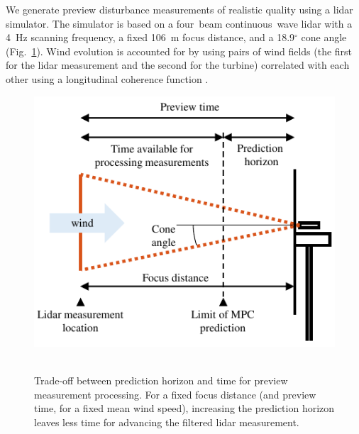 \documentclass[letterpaper, 10 pt, conference]{ieeeconf}  %
\begin{document}
We generate preview disturbance measurements of realistic quality using a lidar simulator. The simulator is based on a four~beam continuous~wave lidar with a 4~Hz scanning frequency,  a fixed 106~m focus distance, and a 18.9$^\circ$ cone angle (Fig.~\ref{fig:horizons}). Wind evolution is accounted for by using pairs of wind fields (the first for the lidar measurement and the second for the turbine) correlated with each other using a longitudinal coherence function \cite{SimleyPao2015}. 
\begin{figure}[thbp]
	\centering
	\mbox{\includegraphics[scale=1.0]{prediction_horizon_geo.pdf}
	}
	\caption{Trade-off between prediction horizon and time for preview measurement processing. For a fixed focus distance (and preview time, for a fixed mean wind speed), increasing the prediction horizon leaves less time for advancing the filtered lidar measurement.}
	\label{fig:horizons}
\end{figure}
\end{document}
